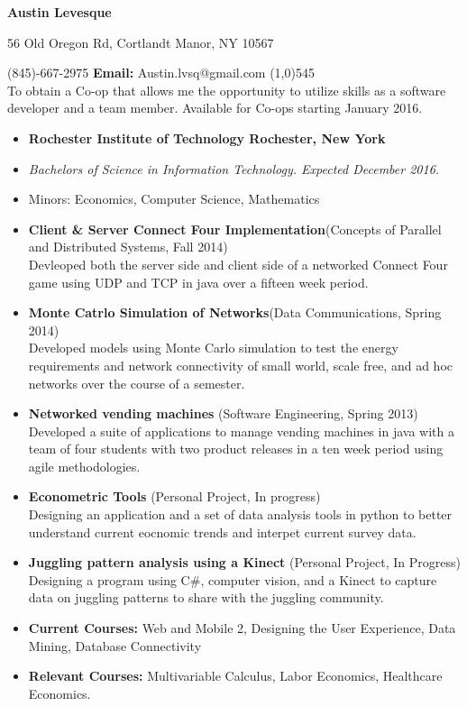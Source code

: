 \documentclass[11pt]{article}
\begin{document}
\centerline{\Large \bf Austin Levesque}
\vspace{.5ex}
\centerline{56 Old Oregon Rd, Cortlandt Manor, NY 10567}
\vspace{1ex}
 (845)-667-2975 \hfill {\bf Email:} Austin.lvsq@gmail.com
\line(1,0){545}\\
To obtain a Co-op that allows me the opportunity to utilize skills as a software developer and a team member. Available for Co-ops starting January 2016.
\vspace{1ex}\\
\begin{itemize}[topsep=1ex, itemsep=0ex, partopsep=0ex, parsep=0ex]
	\item[]{{\bf Rochester Institute of Technology \hfill Rochester, New York}}
  \item[]{\it Bachelors of Science in Information Technology. \hfill Expected December 2016.}
  \item[] Minors: Economics, Computer Science, Mathematics
\end{itemize}
\vspace{1ex}
\begin{itemize}[topsep=.5ex, itemsep=0ex, partopsep=0ex, parsep=1ex]
    \item[] {\bf Client \& Server Connect Four Implementation}(Concepts of Parallel and Distributed Systems, Fall 2014)\\
    Devleoped both the server side and client side of a networked Connect Four game using UDP and TCP in java over a fifteen week period.
	\item[] {\bf Monte Catrlo Simulation of Networks}(Data Communications, Spring 2014)\\
	Developed models using Monte Carlo simulation to test the energy requirements and network connectivity of small world, scale free, and ad hoc networks over the course of a semester.
	\item[] {\bf Networked vending machines} (Software Engineering, Spring 2013)\\
	Developed a suite of applications to manage vending machines in java with a team of four students with two product releases in a ten week period using agile methodologies.
	\item[] {\bf Econometric Tools} (Personal Project, In progress)\\
	Designing  an application and a set of data analysis tools in python to better understand current eocnomic trends and interpet current survey data.
	\item[] {\bf Juggling pattern analysis using a Kinect} (Personal Project, In Progress)\\
    Designing a program using C\#, computer vision, and a Kinect to capture data on juggling patterns to share with the juggling community.
	\item[] {\bf Current Courses:} Web and Mobile 2, Designing the User Experience, Data Mining, Database Connectivity
	\item[] {\bf Relevant Courses:} Multivariable Calculus, Labor Economics, Healthcare Economics.
\end{itemize}
\end{document}
